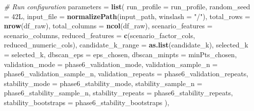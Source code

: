 \documentclass[
]{article}
\newenvironment{Shaded}{\begin{snugshade}}{\end{snugshade}}
\newcommand{\AttributeTok}[1]{\textcolor[rgb]{0.13,0.29,0.53}{#1}}
\newcommand{\CommentTok}[1]{\textcolor[rgb]{0.56,0.35,0.01}{\textit{#1}}}
\newcommand{\DataTypeTok}[1]{\textcolor[rgb]{0.13,0.29,0.53}{#1}}
\newcommand{\DecValTok}[1]{\textcolor[rgb]{0.00,0.00,0.81}{#1}}
\newcommand{\FunctionTok}[1]{\textcolor[rgb]{0.13,0.29,0.53}{\textbf{#1}}}
\newcommand{\NormalTok}[1]{#1}
\newcommand{\StringTok}[1]{\textcolor[rgb]{0.31,0.60,0.02}{#1}}
\begin{document}
\begin{Shaded}
\begin{Highlighting}[]
  \CommentTok{\# Run configuration}
  \AttributeTok{parameters =} \FunctionTok{list}\NormalTok{(}
    \AttributeTok{run\_profile            =}\NormalTok{ run\_profile,}
    \AttributeTok{random\_seed            =} \DecValTok{42}\DataTypeTok{L}\NormalTok{,}
    \AttributeTok{input\_file             =} \FunctionTok{normalizePath}\NormalTok{(input\_path, }\AttributeTok{winslash =} \StringTok{"/"}\NormalTok{),}
    \AttributeTok{total\_rows             =} \FunctionTok{nrow}\NormalTok{(df\_raw),}
    \AttributeTok{total\_columns          =} \FunctionTok{ncol}\NormalTok{(df\_raw),}
    \AttributeTok{scenario\_features      =}\NormalTok{ scenario\_columns,}
    \AttributeTok{reduced\_features       =} \FunctionTok{c}\NormalTok{(scenario\_factor\_cols, reduced\_numeric\_cols),}
    \AttributeTok{candidate\_k\_range      =} \FunctionTok{as.list}\NormalTok{(candidate\_k),}
    \AttributeTok{selected\_k             =}\NormalTok{ selected\_k,}
    \AttributeTok{dbscan\_eps             =}\NormalTok{ eps\_chosen,}
    \AttributeTok{dbscan\_minpts          =}\NormalTok{ minPts\_chosen,}
    \AttributeTok{validation\_mode        =}\NormalTok{ phase6\_validation\_mode,}
    \AttributeTok{validation\_sample\_n    =}\NormalTok{ phase6\_validation\_sample\_n,}
    \AttributeTok{validation\_repeats     =}\NormalTok{ phase6\_validation\_repeats,}
    \AttributeTok{stability\_mode         =}\NormalTok{ phase6\_stability\_mode,}
    \AttributeTok{stability\_sample\_n     =}\NormalTok{ phase6\_stability\_sample\_n,}
    \AttributeTok{stability\_repeats      =}\NormalTok{ phase6\_stability\_repeats,}
    \AttributeTok{stability\_bootstraps   =}\NormalTok{ phase6\_stability\_bootstraps}
\NormalTok{  ),}


\end{Highlighting}
\end{Shaded}
\end{document}
